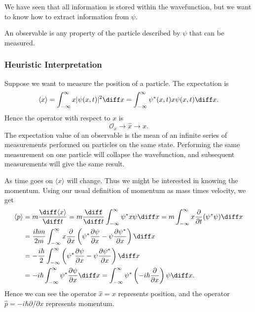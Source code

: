 \documentclass[12pt]{article}
\begin{document}
We have seen that all information is stored within the wavefunction, but we want to know how to extract information from $\psi$.

\begin{definition}
	An observable is any property of the particle described by $\psi$ that can be measured.
\end{definition}

\subsubsection{Heuristic Interpretation}%
\label{subsub:heuristic_interpretation}

Suppose we want to measure the position of a particle. The expectation is
\[
	\langle x \rangle = \int_{-\infty}^{\infty}x |\psi(x, t)|^2\diff x = \int_{-\infty}^{\infty}\psi^{\ast}(x, t) x \psi(x, t)\diff x
.\]
Hence the operator with respect to $x$ is
\[
\mathcal{O}_x \to \hat x \to x
.\]
The expectation value of an observable is the mean of an infinite series of measurements performed on particles on the same state. Performing the same measurement on one particle will collapse the wavefunction, and subsequent measurements will give the same result.

As time goes on $\langle x \rangle$ will change. Thus we might be interested in knowing the momentum. Using our usual definition of momentum as mass times velocity, we get
\begin{align*}
	\langle p \rangle &= m \frac{\diff \langle x \rangle}{\diff t} = m \frac{\diff}{\diff t} \int_{-\infty}^{\infty} \psi^{\ast} x \psi \diff x = m \int_{-\infty}^{\infty} x \frac{\partial}{\partial t}(\psi^{\ast} \psi)\diff x \\
			  &= \frac{i \hbar m}{2m}\int_{-\infty}^{\infty} x \frac{\partial}{\partial x}\left(\psi^{\ast} \frac{\partial \psi}{\partial x} - \psi \frac{\partial \psi^{\ast}}{\partial x}\right) \diff x \\
			  &= - \frac{i \hbar}{2} \int_{-\infty}^{\infty} \left( \psi^{\ast} \frac{\partial \psi}{\partial x} - \psi \frac{\partial \psi^{\ast}}{\partial x} \right) \diff x \\
			  &= - i \hbar \int_{-\infty}^{\infty} \psi^{\ast} \frac{\partial \psi}{\partial x}\diff x = \int_{-\infty}^{\infty} \psi^{\ast} \left(-i\hbar \frac{\partial}{\partial x} \right)\psi \diff x.
\end{align*}
Hence we can see the operator $\hat x = x$ represents position, and the operator $\hat p = - i \hbar \partial/\partial x$ represents momentum.
\end{document}
